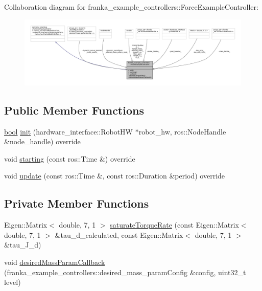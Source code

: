 Collaboration diagram for franka\+\_\+example\+\_\+controllers\+:\+:Force\+Example\+Controller\+:
\nopagebreak
\begin{figure}[H]
\begin{center}
\leavevmode
\includegraphics[width=350pt]{classfranka__example__controllers_1_1ForceExampleController__coll__graph}
\end{center}
\end{figure}
\subsection*{Public Member Functions}
\begin{DoxyCompactItemize}
\item 
\hyperlink{classbool}{bool} \hyperlink{classfranka__example__controllers_1_1ForceExampleController_adb9839ab5bf49901849839bb5ce73932}{init} (hardware\+\_\+interface\+::\+Robot\+HW $\ast$robot\+\_\+hw, ros\+::\+Node\+Handle \&node\+\_\+handle) override
\item 
void \hyperlink{classfranka__example__controllers_1_1ForceExampleController_aaf7bd3ab431911c818d1c3bf312f4f02}{starting} (const ros\+::\+Time \&) override
\item 
void \hyperlink{classfranka__example__controllers_1_1ForceExampleController_ae15ee13e9cb72653edb468127e65fa3c}{update} (const ros\+::\+Time \&, const ros\+::\+Duration \&period) override
\end{DoxyCompactItemize}
\subsection*{Private Member Functions}
\begin{DoxyCompactItemize}
\item 
Eigen\+::\+Matrix$<$ double, 7, 1 $>$ \hyperlink{classfranka__example__controllers_1_1ForceExampleController_ac00e2f9f34f52e96a61e9d694e09fbd7}{saturate\+Torque\+Rate} (const Eigen\+::\+Matrix$<$ double, 7, 1 $>$ \&tau\+\_\+d\+\_\+calculated, const Eigen\+::\+Matrix$<$ double, 7, 1 $>$ \&tau\+\_\+\+J\+\_\+d)
\item 
void \hyperlink{classfranka__example__controllers_1_1ForceExampleController_ac7db01746d2398acab73424e6a98f501}{desired\+Mass\+Param\+Callback} (franka\+\_\+example\+\_\+controllers\+::desired\+\_\+mass\+\_\+param\+Config \&config, uint32\+\_\+t level)
\end{DoxyCompactItemize}
